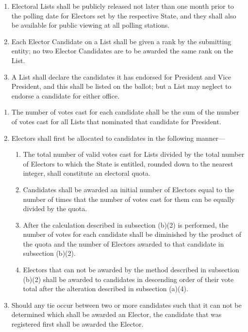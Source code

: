 \documentclass{article}
\begin{document}
\begin{enumerate}
        \item Electoral Lists shall be publicly released not later than one month prior to the polling date for Electors set by the respective State, and they shall also be available for public viewing at all polling stations.
        \item Each Elector Candidate on a List shall be given a rank by the submitting entity; no two Elector Candidates are to be awarded the same rank on the List.
        \item A List shall declare the candidates it has endorsed for President and Vice President, and this shall be listed on the ballot; but a List may neglect to endorse a candidate for either office.
    \end{enumerate}
    \begin{enumerate}
        \item The number of votes cast for each candidate shall be the sum of the number of votes cast for all Lists that nominated that candidate for President.
        \item Electors shall first be allocated to candidates in the following manner---
        \begin{enumerate}
            \item The total number of valid votes cast for Lists divided by the total number of Electors to which the State is entitled, rounded down to the nearest integer, shall constitute an electoral quota.
            \item Candidates shall be awarded an initial number of Electors equal to the number of times that the number of votes cast for them can be equally divided by the quota.
            \item After the calculation described in subsection (b)(2) is performed, the number of votes for each candidate shall be diminished by the product of the quota and the number of Electors awarded to that candidate in subsection (b)(2).
            \item Electors that can not be awarded by the method described in subsection (b)(2) shall be awarded to candidates in descending order of their vote total after the alteration described in subsection (a)(4).
        \end{enumerate}
        \item Should any tie occur between two or more candidates such that it can not be determined which
        shall be awarded an Elector, the candidate that was registered first shall be awarded the Elector.
    \end{enumerate}
\end{document}
